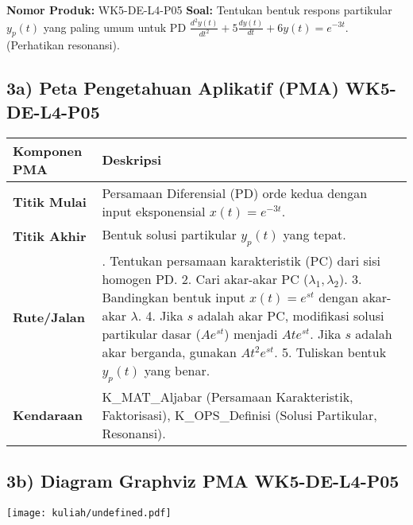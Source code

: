 \documentclass[
  letterpaper,
  DIV=11,
  numbers=noendperiod]{scrreprt}
\begin{document}
\textbf{Nomor Produk:} WK5-DE-L4-P05 \textbf{Soal:} Tentukan bentuk
respons partikular \(y_p(t)\) yang paling umum untuk PD
\(\frac{d^2 y(t)}{dt^2} + 5 \frac{dy(t)}{dt} + 6 y(t) = e^{-3t}\).
(Perhatikan resonansi).

\subsection{3a) Peta Pengetahuan Aplikatif (PMA)
WK5-DE-L4-P05}\label{a-peta-pengetahuan-aplikatif-pma-wk5-de-l4-p05}

\begin{longtable}[]{@{}
  >{\raggedright\arraybackslash}p{}
  >{\raggedright\arraybackslash}p{}@{}}
\toprule\noalign{}
\begin{minipage}[b]{\linewidth}\raggedright
Komponen PMA
\end{minipage} & \begin{minipage}[b]{\linewidth}\raggedright
Deskripsi
\end{minipage} \\
\midrule\noalign{}
\endhead
\bottomrule\noalign{}
\endlastfoot
\textbf{Titik Mulai} & Persamaan Diferensial (PD) orde kedua dengan
input eksponensial \(x(t) = e^{-3t}\). \\
\textbf{Titik Akhir} & Bentuk solusi partikular \(y_p(t)\) yang
tepat. \\
\textbf{Rute/Jalan} & 1. Tentukan persamaan karakteristik (PC) dari sisi
homogen PD. 2. Cari akar-akar PC (\(\lambda_1, \lambda_2\)). 3.
Bandingkan bentuk input \(x(t) = e^{st}\) dengan akar-akar \(\lambda\).
4. Jika \(s\) adalah akar PC, modifikasi solusi partikular dasar
(\(A e^{st}\)) menjadi \(A t e^{st}\). Jika \(s\) adalah akar berganda,
gunakan \(A t^2 e^{st}\). 5. Tuliskan bentuk \(y_p(t)\) yang benar. \\
\textbf{Kendaraan} & K\_MAT\_Aljabar (Persamaan Karakteristik,
Faktorisasi), K\_OPS\_Definisi (Solusi Partikular, Resonansi). \\
\end{longtable}

\subsection{3b) Diagram Graphviz PMA
WK5-DE-L4-P05}\label{b-diagram-graphviz-pma-wk5-de-l4-p05}

\texttt{[image: kuliah/undefined.pdf]}
\end{document}
